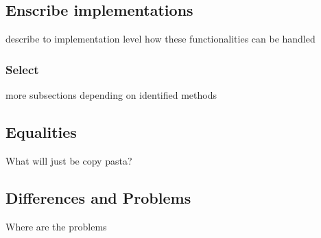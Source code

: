 \subsection{Enscribe implementations}
describe to implementation level how these functionalities can be handled
\subsubsection{Select}
more subsections depending on identified methods

\subsection{Equalities}
What will just be copy pasta?

\subsection{Differences and Problems}
Where are the problems





